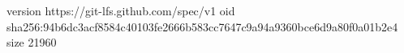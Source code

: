 version https://git-lfs.github.com/spec/v1
oid sha256:94b6dc3acf8584c40103fe2666b583cc7647c9a94a9360bce6d9a80f0a01b2e4
size 21960
